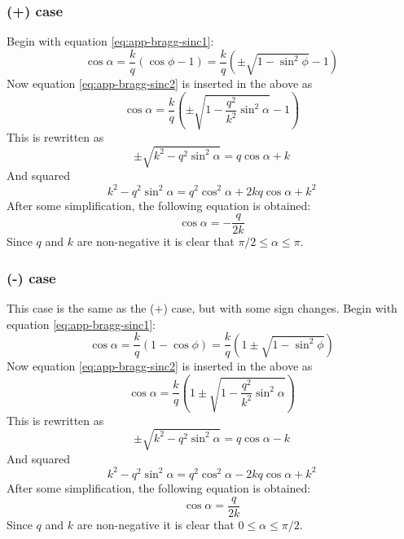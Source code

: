 \documentclass[11pt,twoside]{eitExjobb}
\begin{document}
	\subsubsection{(+) case}
	Begin with equation \eqref{eq:app-bragg-sinc1}:
	\begin{equation*}
		\cos{\alpha} = \frac{k}{q}\left( \cos{\phi} - 1 \right) = \frac{k}{q}\left( \pm \sqrt{1-\sin^2{\phi}} - 1 \right)
	\end{equation*}
	Now equation \eqref{eq:app-bragg-sinc2} is inserted in the above as
	\begin{equation*}
		\cos{\alpha} = \frac{k}{q}\left( \pm \sqrt{1-\frac{q^2}{k^2}\sin^2{\alpha}} - 1 \right)
	\end{equation*}
	This is rewritten as
	\begin{equation*}
		\pm \sqrt{k^2-q^2\sin^2{\alpha}} = q\cos{\alpha} + k
	\end{equation*}
	And squared
	\begin{equation*}
		k^2 - q^2\sin^2{\alpha} = q^2\cos^2{\alpha} + 2kq\cos{\alpha} + k^2
	\end{equation*}
	After some simplification, the following equation is obtained:
	\begin{equation}
		\cos{\alpha} = -\frac{q}{2k} \label{eq:app-bragg-cos+}
	\end{equation}
	Since $q$ and $k$ are non-negative it is clear that $\pi/2 \leq \alpha \leq \pi$.
	
	\subsubsection{(-) case}
	This case is the same as the (+) case, but with some sign changes. Begin with equation \eqref{eq:app-bragg-sinc1}:
	\begin{equation*}
		\cos{\alpha} = \frac{k}{q}\left( 1 - \cos{\phi} \right) = \frac{k}{q}\left( 1 \pm \sqrt{1-\sin^2{\phi}} \right)
	\end{equation*}
	Now equation \eqref{eq:app-bragg-sinc2} is inserted in the above as
	\begin{equation*}
		\cos{\alpha} = \frac{k}{q}\left( 1 \pm \sqrt{1-\frac{q^2}{k^2}\sin^2{\alpha}} \right)
	\end{equation*}
	This is rewritten as
	\begin{equation*}
		\pm \sqrt{k^2-q^2\sin^2{\alpha}} = q\cos{\alpha} - k
	\end{equation*}
	And squared
	\begin{equation*}
		k^2 - q^2\sin^2{\alpha} = q^2\cos^2{\alpha} - 2kq\cos{\alpha} + k^2
	\end{equation*}
	After some simplification, the following equation is obtained:
	\begin{equation}
		\cos{\alpha} = \frac{q}{2k} \label{eq:app-bragg-cos-}
	\end{equation}
	Since $q$ and $k$ are non-negative it is clear that $0 \leq \alpha \leq \pi/2$.
\end{document}
